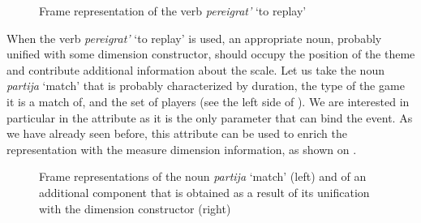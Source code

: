 \begin{figure}
\centering
{}
\caption{Frame representation of the verb \textit{pereigrat'} `to replay' \label{frame:pere:igrat}}
\end{figure}

When the verb \textit{pereigrat'} `to replay' is used, an appropriate noun, probably unified with some dimension constructor, should occupy the position of the theme and contribute additional information about the scale. Let us take the noun \textit{partija} `match' that is probably characterized by duration, the type of the game it is a match of, and the set of players (see the left side of ). We are interested in particular in the \DURATION attribute as it is the only parameter that can bind the event. As we have already seen before, this attribute can be used to enrich the representation with the measure dimension information, as shown on .

\begin{figure}\small
\hfill%
\caption{Frame representations of the noun \textit{partija} `match' (left) and of an additional component that is obtained as a result of its unification with the dimension constructor (right) \label{frame:match}}
\end{figure}


